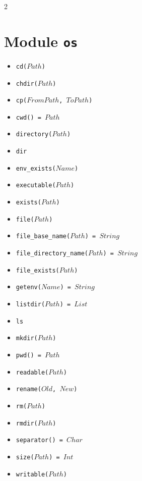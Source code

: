 \documentclass[10pt]{article}
\newcommand{\ignore}[1]{}
\begin{document}
\begin{multicols}{2}
\section*{Module \texttt{os}}
\begin{scriptsize}
\begin{itemize}
\item \texttt{cd($Path$)}
\item \texttt{chdir($Path$)}
\item \texttt{cp($FromPath$, $ToPath$)}
\item \texttt{cwd() = $Path$}
\item \texttt{directory($Path$)}
\item \texttt{dir}
\item \texttt{env\_exists($Name$)}
\item \texttt{executable($Path$)}
\item \texttt{exists($Path$)}
\item \texttt{file($Path$)}
\item \texttt{file\_base\_name($Path$) = $String$}
\item \texttt{file\_directory\_name($Path$) = $String$}
\item \texttt{file\_exists($Path$)}
\item \texttt{getenv($Name$) = $String$}
\item \texttt{listdir($Path$) = $List$}
\item \texttt{ls}
\item \texttt{mkdir($Path$)}
\item \texttt{pwd() = $Path$}
\item \texttt{readable($Path$)}
\item \texttt{rename($Old$, $New$)}
\item \texttt{rm($Path$)}
\item \texttt{rmdir($Path$)}
\item \texttt{separator() = $Char$}
\item \texttt{size($Path$) = $Int$}
\item \texttt{writable($Path$)}
\ignore{
\item \texttt{atime($Path$) = $DateTime$}
\item \texttt{block\_special($Path$)}
\item \texttt{char\_special($Path$)}
\item \texttt{chmod($Path$, $Mode$)}
\item \texttt{create($Path$)}
\item \texttt{create($Path$, $Mode$)}
}
\end{itemize}
\end{scriptsize}
\end{multicols}
\end{document}
